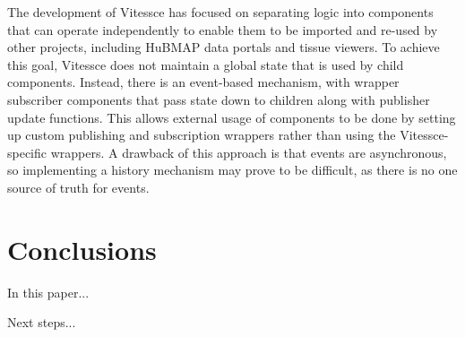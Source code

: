\documentclass[12pt, letterpaper]{article}
\begin{document}


The development of Vitessce has focused on separating logic into components that can operate independently to enable them to be imported and re-used by other projects, including HuBMAP data portals and tissue viewers.
To achieve this goal, Vitessce does not maintain a global state that is used by child components.
Instead, there is an event-based mechanism, with wrapper subscriber components that pass state down to children along with publisher update functions.
This allows external usage of components to be done by setting up custom publishing and subscription wrappers rather than using the Vitessce-specific wrappers.
A drawback of this approach is that events are asynchronous, so implementing a history mechanism may prove to be difficult, as there is no one source of truth for events.








\section{Conclusions}
In this paper...

Next steps...



{}

\end{document}
